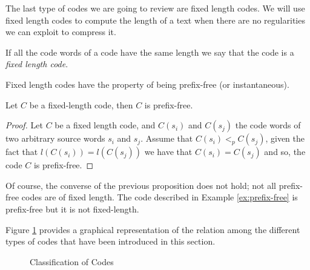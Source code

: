 The last type of codes we are going to review are fixed length codes. We will use fixed length codes to compute the length of a text when there are no regularities we can exploit to compress it.

\begin{definition}
\label{def:Fixed-Length-Codes}
If all the code words of a code have the same length we say that the code is a \emph{fixed length code}.
\end{definition}

Fixed length codes have the property of being prefix-free (or instantaneous).

\begin{proposition}
Let $C$ be a fixed-length code, then $C$ is prefix-free.
\end{proposition}
\begin{proof}
Let $C$ be a fixed length code, and $C(s_i)$ and $C(s_j)$ the code words of two arbitrary source words $s_i$ and $s_j$. Assume that $C(s_i) <_p C(s_j)$, given the fact that $l(C(s_i)) = l(C(s_j))$ we have that $C(s_i) = C(s_j)$ and so, the code $C$ is prefix-free.
\end{proof}

Of course, the converse of the previous proposition does not hold; not all prefix-free codes are of fixed length. The code described in Example \ref{ex:prefix-free} is prefix-free but it is not fixed-length.

Figure \ref{fig:Classification-Codes} provides a graphical representation of the relation among the different types of codes that have been introduced in this section.

\begin{figure}[t]
\centering
{}
\caption{\label{fig:Classification-Codes}Classification of Codes}
\end{figure}

